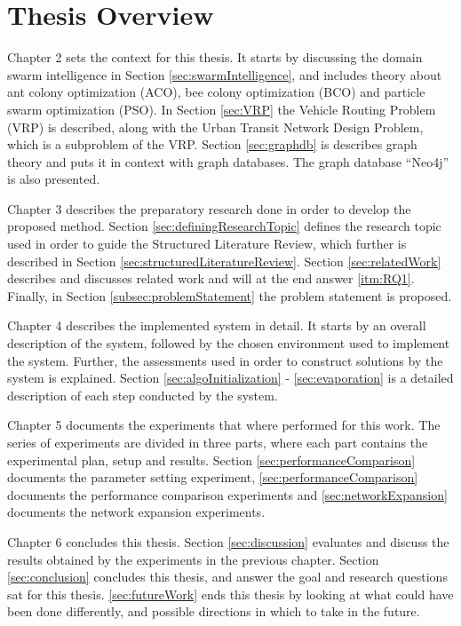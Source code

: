 \section{Thesis Overview}



Chapter 2 sets the context for this thesis. It starts by discussing the domain swarm intelligence in Section \ref{sec:swarmIntelligence}, and includes theory about ant colony optimization (ACO), bee colony optimization (BCO) and particle swarm optimization (PSO). In Section \ref{sec:VRP} the Vehicle Routing Problem (VRP) is described, along with the Urban Transit Network Design Problem, which is a subproblem of the VRP. Section \ref{sec:graphdb} is describes graph theory and puts it in context with graph databases. The graph database ``Neo4j'' is also presented. 

Chapter 3 describes the preparatory research done in order to develop the proposed method. Section \ref{sec:definingResearchTopic} defines the research topic used in order to guide the Structured Literature Review\citep{kofod2014}, which further is described in Section \ref{sec:structuredLiteratureReview}. Section \ref{sec:relatedWork} describes and discusses related work and will at the end answer \ref{itm:RQ1}. Finally, in Section \ref{subsec:problemStatement} the problem statement is proposed.  

Chapter 4 describes the implemented system in detail. It starts by an overall description of the system, followed by the chosen environment used to implement the system. Further, the assessments used in order to construct solutions by the system is explained. Section \ref{sec:algoInitialization} - \ref{sec:evaporation} is a detailed description of each step conducted by the system.

Chapter 5 documents the experiments that where performed for this work. The series of experiments are divided in three parts, where each part contains the experimental plan, setup and results. Section \vref{sec:performanceComparison} documents the parameter setting experiment, \vref{sec:performanceComparison} documents the performance comparison experiments and \vref{sec:networkExpansion} documents the network expansion experiments.

Chapter 6 concludes this thesis. Section \vref{sec:discussion} evaluates and discuss the results obtained by the experiments in the previous chapter. Section \vref{sec:conclusion} concludes this thesis, and answer the goal and research questions sat for this thesis. \vref{sec:futureWork} ends this thesis by looking at what could have been done differently, and possible directions in which to take in the future. 

